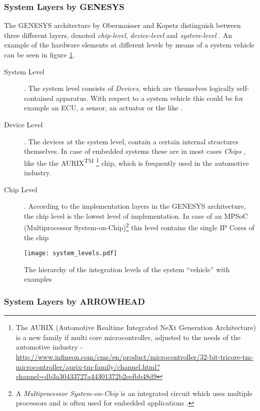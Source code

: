 \subsubsection{System Layers by GENESYS}
The GENESYS architecture by Obermaisser and Kopetz distinguish between three different layers, denoted \emph{chip-level}, \emph{device-level} and \emph{system-level} \cite[p.44]{genesys}. An example of the hardware elements at different levels by means of a system vehicle can be seen in figure \ref{fig:integration_levels}.
\begin{description}
\item [System Level] .
The system level consists of \emph{Devices}, which are themselves logically self-contained apparatus. With respect to a system vehicle this could be for example an ECU, a sensor, an actuator or the like \cite[p.45]{genesys}.
\item [Device Level] .
The devices at the system level, contain a certain internal structures themselves. In case of embedded systems these are in most cases \emph{Chips} \cite[p.45]{genesys}, like the the AURIX\textsuperscript{TM} \footnote{The AURIX (Automotive Realtime Integrated NeXt Generation Architecture) is a new family if multi core microcontroller, adjusted to the needs of the automotive industry - \url{http://www.infineon.com/cms/en/product/microcontroller/32-bit-tricore-tm-microcontroller/aurix-tm-family/channel.html?channel=db3a30433727a44301372b2eefbb48d9}} chip, which is frequently used in the automotive industry.
\item [Chip Level] .
According to the implementation layers in the GENESYS architecture, the chip level is the lowest level of implementation. In case of an MPSoC (Multiprocessor System-on-Chip)\footnote{A \emph{Multiprocessor System-on-Chip} is an integrated circuit which uses multiple processors and is often used for embedded applications \cite{wiki_MPSoC}.} this level contains the single IP Cores of the chip \cite[p.46]{genesys}
\end{description}

\begin{figure}[ht]
\centering
\texttt{[image: system\_levels.pdf]}
\caption{The hierarchy of the integration levels of the system ``vehicle'' with examples}
\label{fig:integration_levels}
\end{figure}

\subsubsection{System Layers by ARROWHEAD}


